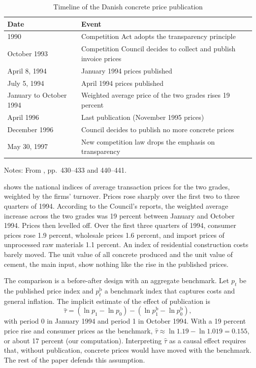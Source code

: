 \begin{table}[htbp]
\centering
\caption{Timeline of the Danish concrete price publication}\label{tab:13-albaek-timeline}
\small
\begin{tabular}{@{}ll@{}}
\toprule
Date & Event\\
\midrule
1990 & Competition Act adopts the transparency principle\\
October 1993 & Competition Council decides to collect and publish invoice prices\\
April 8, 1994 & January 1994 prices published\\
July 5, 1994 & April 1994 prices published\\
January to October 1994 & Weighted average price of the two grades rises 19 percent\\
April 1996 & Last publication (November 1995 prices)\\
December 1996 & Council decides to publish no more concrete prices\\
May 30, 1997 & New competition law drops the emphasis on transparency\\
\bottomrule
\end{tabular}

\smallskip
\begin{minipage}{0.8\textwidth}\footnotesize
Notes: From \citet{AlbaekMollgaardOvergaard1997}, pp.~430--433 and 440--441.
\end{minipage}
\end{table}

 shows the national indices of average transaction prices for the two grades, weighted by
the firms' turnover. Prices rose sharply over the first two to three quarters of 1994. According to the Council's
reports, the weighted average increase across the two grades was 19 percent between January and October 1994.
Prices then levelled off. Over the first three quarters of 1994, consumer prices rose 1.9 percent, wholesale
prices 1.6 percent, and import prices of unprocessed raw materials 1.1 percent. An index of residential
construction costs barely moved. The unit value of all concrete produced and the unit value of cement, the main
input, show nothing like the rise in the published prices.

The comparison is a before-after design with an aggregate benchmark. Let $p_t$ be the published price index and
$p^{\mathrm{b}}_t$ a benchmark index that captures costs and general inflation. The implicit estimate of the effect
of publication is
\begin{equation}\label{eq:13-albaek-tau}
  \hat\tau = \left(\ln p_{1} - \ln p_{0}\right) - \left(\ln p^{\mathrm{b}}_{1} - \ln p^{\mathrm{b}}_{0}\right),
\end{equation}
with period 0 in January 1994 and period 1 in October 1994. With a 19 percent price rise and consumer prices as the
benchmark, $\hat\tau \approx \ln 1.19 - \ln 1.019 = 0.155$, or about 17 percent (our computation).
Interpreting $\hat\tau$ as a causal effect requires that, without publication, concrete prices would have moved
with the benchmark. The rest of the paper defends this assumption.

